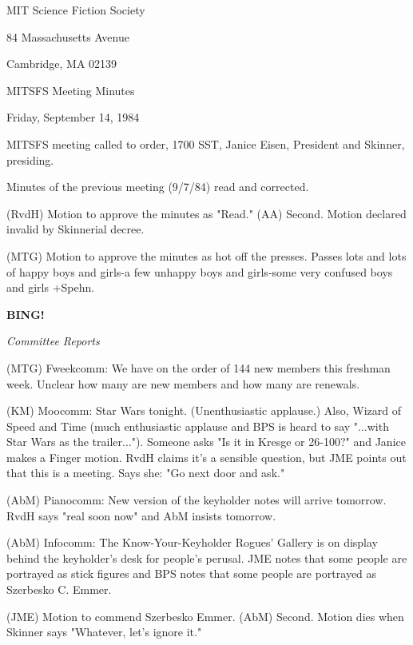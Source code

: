 \documentclass[12pt]{article}
\newcommand{\bing}{{\bf BING!} }
\newcommand{\goto}[1]{\bing \vskip 12pt \centerline{{\em{#1}}}}
\begin{document}
\begin{center}

MIT Science Fiction Society 

84 Massachusetts Avenue

Cambridge, MA 02139

\vspace{12pt}

MITSFS Meeting Minutes 

Friday, September 14, 1984

\end{center}
 
\vspace{18pt}

\setlength{\parskip}{6pt}

\noindent
MITSFS meeting called to order, 1700 SST,
Janice Eisen, President and Skinner, presiding.

Minutes of the previous meeting (9/7/84) read and corrected.

(RvdH) Motion to approve the minutes as "Read." (AA) Second. Motion declared invalid by Skinnerial decree.

(MTG) Motion to approve the minutes as hot off the presses. Passes lots and lots of happy boys and girls-a few unhappy boys and girls-some very confused boys and girls +Spehn.

\goto{Committee Reports}

(MTG) Fweekcomm: We have on the order of 144 new members this freshman week. Unclear how many are new members and how many are renewals.

(KM) Moocomm: Star Wars tonight. (Unenthusiastic applause.) Also, Wizard of Speed and Time (much enthusiastic applause and BPS is heard to say "...with Star Wars as the trailer..."). Someone asks "Is it in Kresge or 26-100?" and Janice makes a Finger motion. RvdH claims it's a sensible question, but JME points out that this is a meeting. Says she: "Go next door and ask."

(AbM) Pianocomm: New version of the keyholder notes will arrive tomorrow. RvdH says "real soon now" and AbM insists tomorrow.

(AbM) Infocomm: The Know-Your-Keyholder Rogues' Gallery is on display behind the keyholder's desk for people's perusal. JME notes that some people are portrayed as stick figures and BPS notes that some people are portrayed as Szerbesko C. Emmer.

(JME) Motion to commend Szerbesko Emmer. (AbM) Second. Motion dies when Skinner says "Whatever, let's ignore it."
\end{document}
